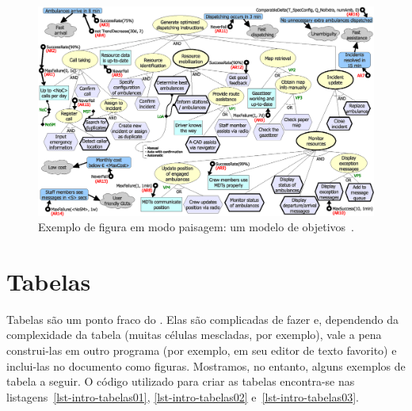 \begin{figure}
	\centering
	\includegraphics[width=\textwidth]{figuras/fig-intro-exemplosideways} 
	\caption{Exemplo de figura em modo paisagem: um modelo de objetivos~\cite{souza-mylopoulos:spe13}.}
	\label{fig-intro-exemplosideways}
\end{figure}



\section{Tabelas}
\label{sec-intro-tabelas}

Tabelas são um ponto fraco do \latex. Elas são complicadas de fazer e, dependendo da complexidade da tabela (muitas células mescladas, por exemplo), vale a pena construi-las em outro programa (por exemplo, em seu editor de texto favorito) e inclui-las no documento como figuras. Mostramos, no entanto, alguns exemplos de tabela a seguir. O código utilizado para criar as tabelas encontra-se nas listagens~\ref{lst-intro-tabelas01}, \ref{lst-intro-tabelas02} e~\ref{lst-intro-tabelas03}.







